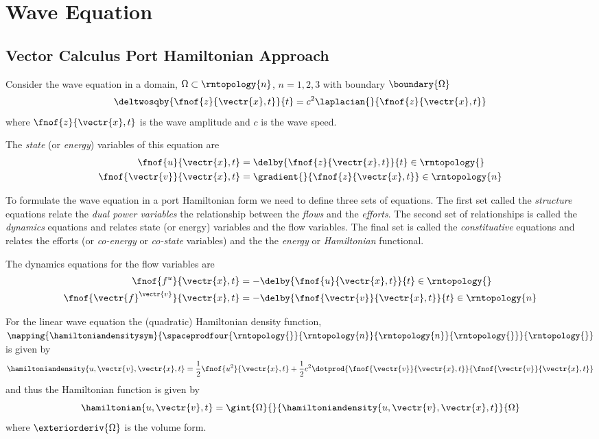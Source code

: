 \section{Wave Equation}
\label{sec:PHWaveEquation}

\subsection{Vector Calculus Port Hamiltonian Approach}

Consider the wave equation in a domain, $\Omega\subset\rntopology{n}$,
$n=1,2,3$ with boundary $\boundary{\Omega}$ \ie
\begin{equation}
  \deltwosqby{\fnof{z}{\vectr{x},t}}{t}=c^{2}\laplacian{}{\fnof{z}{\vectr{x},t}}
\end{equation}
where $\fnof{z}{\vectr{x},t}$ is the wave amplitude and $c$ is the wave speed.

The \emph{state} (or \emph{energy}) variables of this equation are
\begin{align}
    \fnof{u}{\vectr{x},t}&=\delby{\fnof{z}{\vectr{x},t}}{t}\in\rntopology{} \\
    \fnof{\vectr{v}}{\vectr{x},t}&=\gradient{}{\fnof{z}{\vectr{x},t}}\in\rntopology{n}
\end{align}

To formulate the wave equation in a port Hamiltonian form we need to define
three sets of equations. The first set called the \emph{structure} equations
relate the \emph{dual power variables} \ie the relationship between the
\emph{flows} and the \emph{efforts}. The second set of relationships is called
the \emph{dynamics} equations and relates state (or energy) variables and the
flow variables. The final set is called the \emph{constituative} equations and
relates the efforts (or \emph{co-energy} or \emph{co-state} variables) and the
the \emph{energy} or \emph{Hamiltonian} functional.

The dynamics equations for the flow variables are
\begin{align}
  \fnof{f^{u}}{\vectr{x},t}&=-\delby{\fnof{u}{\vectr{x},t}}{t}\in\rntopology{} \\
  \fnof{\vectr{f}^{\vectr{v}}}{\vectr{x},t}&=-\delby{\fnof{\vectr{v}}{\vectr{x},t}}{t}\in\rntopology{n}
\end{align}

For the linear wave equation the (quadratic) Hamiltonian density function,
$\mapping{\hamiltoniandensitysym}{\spaceprodfour{\rntopology{}}{\rntopology{n}}{\rntopology{n}}{\rntopology{}}}{\rntopology{}}$
is given by
\begin{equation}
  \hamiltoniandensity{u,\vectr{v},\vectr{x},t}=\dfrac{1}{2}\fnof{u^{2}}{\vectr{x},t}+\dfrac{1}{2}c^{2}\dotprod{\fnof{\vectr{v}}{\vectr{x},t}}{\fnof{\vectr{v}}{\vectr{x},t}}
\end{equation}
and thus the Hamiltonian function is given by
\begin{equation}
  \hamiltonian{u,\vectr{v},t}=\gint{\Omega}{}{\hamiltoniandensity{u,\vectr{v},\vectr{x},t}}{\Omega}
\end{equation}
where $\exteriorderiv{\Omega}$ is the volume form.

